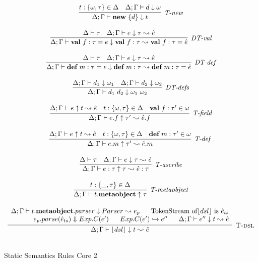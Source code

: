 \begin{figure}
\centering
\[
\begin{array}{c}

\infer[\textit{T-new}]
	{\Delta; \Gamma \vdash \keyw{new}\ \{ d \} \downarrow  t }
	{ t:\{\omega,\tau\} \in \Delta & \Delta;\Gamma \vdash d \downarrow \omega} \\[3ex]


\infer[\textit{DT-val}]
	{\Delta; \Gamma \vdash \keyw{val}~ f:\tau = e \downarrow \keyw{val}~ f:\tau  \leadsto \keyw{val}~ f:\tau = \hat{e}}
	{\Delta \vdash \tau &\Delta; \Gamma \vdash e \downarrow \tau \leadsto \hat{e} } \\[3ex]
	
\infer[\textit{DT-def}]
	{\Delta; \Gamma \vdash \keyw{def}~ m:\tau = e \downarrow \keyw{def}~ m:\tau \leadsto \keyw{def}~ m:\tau = \hat{e} }
	{\Delta \vdash \tau  & \Delta; \Gamma \vdash e  \downarrow \tau \leadsto \hat{e} } \\[3ex]

	
\infer[\textit{DT-defs}]
	{\Delta; \Gamma \vdash d_1\ d_2 \downarrow \omega_1\ \omega_2 }
	{\Delta; \Gamma \vdash d_1 \downarrow \omega_1 &  \Delta; \Gamma \vdash d_2 \downarrow \omega_2 } \\[3ex]


\infer[\textit{T-field}]
	{\Delta; \Gamma \vdash  e.f \uparrow \tau' \leadsto \hat{e}.f} 
	{\Delta; \Gamma \vdash e \uparrow t \leadsto \hat{e} & t:\{\omega, \tau\}\in \Delta & \keyw{val}\ f:\tau' \in \omega  }\\[3ex]

 
\infer[\textit{T-def }]
	{\Delta; \Gamma \vdash  e.m \uparrow\tau' \leadsto \hat{e}.m} 
	{\Delta; \Gamma \vdash e \uparrow t \leadsto \hat{e} & t: \{\omega, \tau\} \in \Delta & \keyw{def}\ m:\tau' \in \omega }\\[3ex]

\infer[\textit{T-ascribe}]
	{\Delta; \Gamma  \vdash  e:\tau \uparrow \tau \leadsto \hat{e}:\tau}
	{\Delta \vdash \tau & \Delta; \Gamma \vdash e \downarrow \tau \leadsto \hat{e} } \\[3ex]


\infer[\textit{T-metaobject}]
        {\Delta; \Gamma \vdash t.\keyw{metaobject} \uparrow \tau   }
	{t:\{\_, \tau\} \in \Delta} \\[3ex]

\infer[\textsc{T-dsl}]
	  {\Delta; \Gamma \vdash \lfloor dsl \rfloor \downarrow t \leadsto \hat{e} }
	  {\renewcommand{\arraystretch}{1}
	    \begin{array}{r}
	    \Delta;\Gamma \vdash t.\keyw{metaobject}.parser\downarrow Parser \leadsto e_p ~~~~~ \text{TokenStream of} \lfloor dsl \rfloor\ \text{is}\ \hat{e}_{ts}\\
            e_p.parse(\hat{e}_{ts}) \Downarrow Exp.C(e') ~~~~~ Exp.C(e') \hookrightarrow e'' ~~~~~ \Delta;\Gamma\vdash e''\downarrow t \leadsto \hat{e}
            \end{array}
       } \\[3ex]   
\end{array}
\]
\caption{Static Semantics Rules Core 2}
\end{figure}


